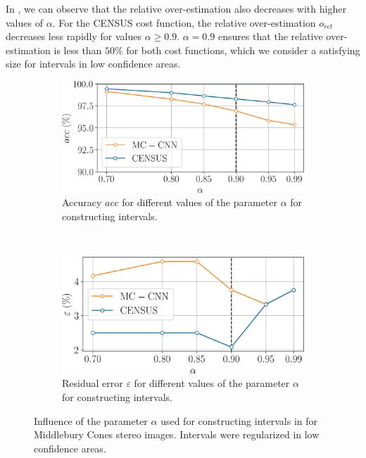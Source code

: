 In , we can observe that the relative over-estimation also decreases with higher values of $\alpha$. For the CENSUS cost function, the relative over-estimation $o_{rel}$ decreases less rapidly for values $\alpha\geqslant0.9$. $\alpha=0.9$ ensures that the relative over-estimation is less than $50\%$ for both cost functions, which we consider a satisfying size for intervals in low confidence areas. 
\begin{figure}
    \centering
    \begin{subfigure}[t]{0.7\linewidth}
        \centering
        \includegraphics[width=\linewidth]{Images/X_Annex/ablation_study_cones_alpha_acc.png}
        \caption{Accuracy $acc$ for different values of the parameter $\alpha$ for constructing intervals.}
        \label{fig:ablation_study_alpha_acc}
    \end{subfigure}\vspace*{0.3cm}\\
    \begin{subfigure}[t]{0.7\linewidth}
        \centering
        \includegraphics[width=\linewidth]{Images/X_Annex/ablation_study_cones_alpha_eps.png}
        \caption{Residual error $\varepsilon$ for different values of the parameter $\alpha$ for constructing intervals.}
        \label{fig:ablation_study_alpha_eps}
    \end{subfigure}
    \caption{Influence of the parameter $\alpha$ used for constructing intervals in  for Middlebury Cones stereo images. Intervals were regularized in low confidence areas.}
    \label{fig:ablation_study_alpha_1}
\end{figure}
